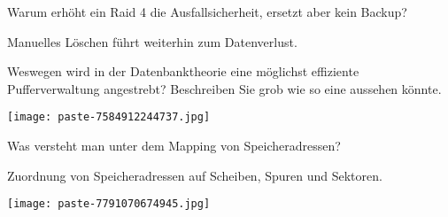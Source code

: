 \documentclass{article}
\begin{document}
\begin{tcolorbox}[colback=white!10!white,colframe=lightgray!75!black,
  savelowerto=\jobname_ex.tex]

\begin{center}
 Warum erhöht ein Raid 4 die Ausfallsicherheit, ersetzt aber kein Backup? 

\end{center}

\tcblower

\justifying
Manuelles Löschen führt weiterhin zum Datenverlust.

\end{tcolorbox}
\begin{tcolorbox}[colback=white!10!white,colframe=lightgray!75!black,
  savelowerto=\jobname_ex.tex]

\begin{center}
 Weswegen wird in der Datenbanktheorie eine möglichst effiziente Pufferverwaltung angestrebt? Beschreiben Sie grob wie so eine aussehen könnte. 

\end{center}

\tcblower

\justifying
\texttt{[image: paste-7584912244737.jpg]}
\end{tcolorbox}
\begin{tcolorbox}[colback=white!10!white,colframe=lightgray!75!black,
  savelowerto=\jobname_ex.tex]

\begin{center}
 Was versteht man unter dem 
Mapping
von Speicheradressen? 

\end{center}

\tcblower

\justifying
Zuordnung von Speicheradressen auf Scheiben, Spuren und Sektoren.

\end{tcolorbox}
\begin{tcolorbox}[colback=white!10!white,colframe=lightgray!75!black,
  savelowerto=\jobname_ex.tex]

\begin{center}
\texttt{[image: paste-7791070674945.jpg]}
\end{center}

\tcblower

\justifying

\end{tcolorbox}
\end{document}
